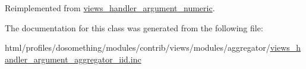 Reimplemented from \hyperlink{classviews__handler__argument__numeric_a5c6f566b06bad6057e92f15d82311c7b}{views\_\-handler\_\-argument\_\-numeric}.

The documentation for this class was generated from the following file:\begin{DoxyCompactItemize}
\item 
html/profiles/dosomething/modules/contrib/views/modules/aggregator/\hyperlink{views__handler__argument__aggregator__iid_8inc}{views\_\-handler\_\-argument\_\-aggregator\_\-iid.inc}\end{DoxyCompactItemize}
